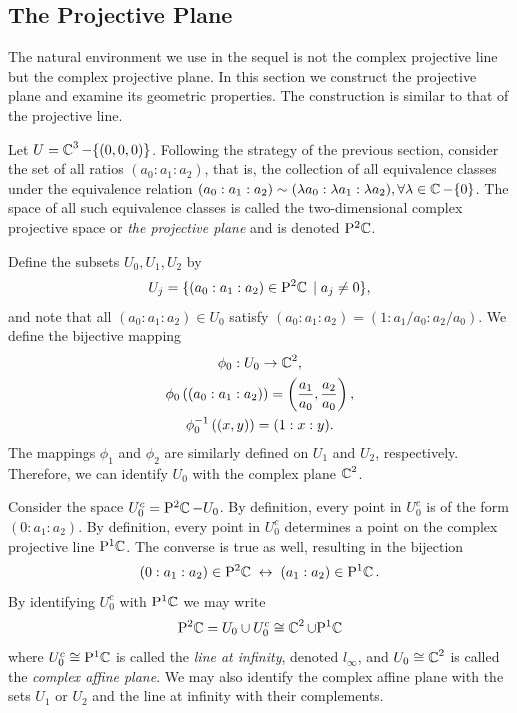 \subsection{The Projective Plane}

The natural environment we use in the sequel is not the complex projective line
but the complex projective plane. In this section we construct the projective
plane and examine its geometric properties. The construction is similar to that
of the projective line.

Let $U = \operatorname{\mathbb{C}}^3 - \{(0,0,0)\}$. Following the strategy of the previous section,
consider the set of all ratios $(a_0 : a_1 : a_2)$, that is, the collection of
all equivalence classes under the equivalence relation $(a_0 : a_1 : a_2) \sim
(\lambda a_0 : \lambda a_1 : \lambda a_2), \forall \lambda \in \operatorname{\mathbb{C}} - \{0\}$. The
space of all such equivalence classes is called the two-dimensional complex
projective space or {\it the projective plane} and is denoted $\mathrm{P}^2 \!\operatorname{\mathbb{C}}$.

Define the subsets $U_0,U_1,U_2$ by
\[
  U_j = \{ (a_0 : a_1 : a_2) \in \mathrm{P}^2 \!\operatorname{\mathbb{C}} \; | \; a_j \neq 0 \},
\]
and note that all $(a_0 : a_1 : a_2) \in U_0$ satisfy $(a_0 : a_1 : a_2) = (1 :
a_1/a_0 : a_2/a_0)$. We define the bijective mapping
\begin{gather*}
  \phi_0 : U_0 \to \operatorname{\mathbb{C}}^2, \\
  \phi_0 \left( (a_0 : a_1 : a_2) \right) =
  \left( \frac{a_1}{a_0}, \frac{a_2}{a_0} \right), \\
  \phi_0^{-1} \left( (x,y) \right) = (1 : x : y).
\end{gather*}
The mappings $\phi_1$ and $\phi_2$ are similarly defined on $U_1$ and $U_2$,
respectively. Therefore, we can identify $U_0$ with the complex plane $\operatorname{\mathbb{C}}^2$.

Consider the space $U_0^c = \mathrm{P}^2 \!\operatorname{\mathbb{C}} - U_0$. By definition, every point in
$U_0^c$ is of the form $(0 : a_1 : a_2)$. By definition, every point in $U_0^c$
determines a point on the complex projective line $\mathrm{P}^1 \!\operatorname{\mathbb{C}}$. The converse is
true as well, resulting in the bijection
\[
  (0 : a_1 : a_2) \in \mathrm{P}^2 \!\operatorname{\mathbb{C}} \; \leftrightarrow \; (a_1 : a_2) \in \mathrm{P}^1 \!\operatorname{\mathbb{C}}.
\]
By identifying $U_0^c$ with $\mathrm{P}^1 \!\operatorname{\mathbb{C}}$ we may write
\begin{equation} \label{eqn: proejctive-plane} \mathrm{P}^2 \!\operatorname{\mathbb{C}} = U_0 \cup U_0^c \cong
  \operatorname{\mathbb{C}}^2 \cup \mathrm{P}^1 \!\operatorname{\mathbb{C}}
\end{equation}
where $U_0^c \cong \mathrm{P}^1 \!\operatorname{\mathbb{C}}$ is called the {\it line at infinity}, denoted
$l_\infty$, and $U_0 \cong \operatorname{\mathbb{C}}^2$ is called the {\it complex affine plane}. We
may also identify the complex affine plane with the sets $U_1$ or $U_2$ and the
line at infinity with their complements.

